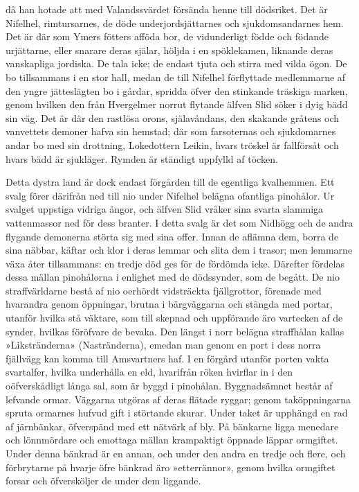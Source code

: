 då han hotade att med Valandssvärdet försända henne till dödsriket. Det
är Nifelhel, rimtursarnes, de döde underjordsjättarnes och
sjukdomsandarnes hem. Det är där som Ymers fötters afföda bor, de
vidunderligt födde och födande urjättarne, eller snarare deras själar,
höljda i en spöklekamen, liknande deras vanskapliga jordiska. De tala
icke; de endast tjuta och stirra med vilda ögon. De bo tillsammans i en
stor hall, medan de till Nifelhel förflyttade medlemmarne af den yngre
jätteslägten bo i gårdar, spridda öfver den stinkande träskiga marken,
genom hvilken den från Hvergelmer norrut flytande älfven Slid söker i
dyig bädd sin väg. Det är där den rastlösa orons, själavåndans, den
skakande gråtens och vanvettets demoner hafva sin hemstad; där som
farsoternas och sjukdomarnes andar
bo med sin drottning, Lokedottern Leikin, hvars tröskel är fallförsåt
och hvars bädd är sjukläger. Rymden är ständigt uppfylld af töcken.

Detta dystra land är dock endast förgården till de egentliga kvalhemmen.
Ett svalg förer därifrån ned till nio under Nifelhel belägna ofantliga
pinohålor. Ur svalget uppstiga vidriga ångor, och älfven Slid vräker
sina svarta slammiga vattenmassor ned för dess branter. I detta svalg är
det som Nidhögg och de andra flygande demonerna störta sig med sina
offer. Innan de aflämna dem, borra de sina näbbar, käftar och klor i
deras lemmar och slita dem i trasor; men lemmarne växa åter tillsammans:
en tredje död ges för de fördömda icke. Därefter fördelas dessa mällan
pinohålorna i enlighet med de dödssynder, som de begått. De nio
straffvärldarne bestå af nio oerhördt vidsträckta fjällgrottor, förenade
med hvarandra genom öppningar, brutna i bärgväggarna och stängda med
portar, utanför hvilka stå väktare, som till skepnad och uppförande äro
vartecken af de synder, hvilkas föröfvare de bevaka. Den längst i norr
belägna straffhålan kallas »Likstränderna» (Nastränderna), emedan man
genom en port i dess norra fjällvägg kan komma till Amsvartners haf. I
en förgård utanför porten vakta svartalfer, hvilka underhålla en eld,
hvarifrån röken hvirflar in i den oöfverskådligt långa sal, som är byggd
i pinohålan. Byggnadsämnet består af lefvande ormar. Väggarna utgöras af
deras flätade ryggar; genom taköppningarna spruta ormarnes hufvud gift i
störtande skurar. Under taket är upphängd en rad af järnbänkar,
öfverspänd med ett nätvärk af bly. På bänkarne ligga menedare och
lönnmördare och emottaga mällan krampaktigt öppnade läppar ormgiftet.
Under denna bänkrad är en annan, och under den andra en tredje och
flere, och förbrytarne på hvarje öfre bänkrad äro »etterrännor», genom
hvilka ormgiftet forsar och öfversköljer de under dem liggande.

